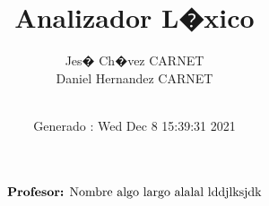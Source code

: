 \documentclass[letterpaper,twoside,12pt]{article}
\title{Analizador L�xico}
\date {Generado : Wed Dec  8 15:39:31 2021
}\author{Jes� Ch�vez CARNET \\  Daniel Hernandez CARNET \\ \\}
\begin{document}
\begin{titlepage}
\maketitle
\sffamily
\begin{align*}
\text{\textbf{Profesor:} Nombre algo largo alalal lddjlksjdk} \\ 
\end{align*}
\end{titlepage}
\end{document}
